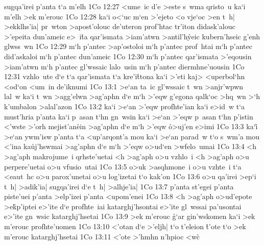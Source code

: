 sugqa'irei
p'anta
t`a
m'elh\bibvsend
\vs 1Co 12:27
<ume~ic
d'e
>este
s~wma
qristo~u
ka`i
m'elh
>ek
m'erouc\bibvsend
\vs 1Co 12:28
ka`i
o<`uc
m`en
>'ejeto
<o
vje`oc
>en
t~h|
>ekklhs'ia|
pr~wton
>apost'olouc
de'uteron
prof'htac
tr'iton
didask'alouc
>'epeita
dun'ameic
e>~i\r{t}a
qar'ismata
>iam'atwn
>antil'h\r{y}eic
kubern'hseic
g'enh
glwss~wn\bibvsend
\vs 1Co 12:29
m`h
p'antec
>ap'ostoloi
m`h
p'antec
prof~htai
m`h
p'antec
did'askaloi
m`h
p'antec
dun'ameic\bibvsend
\vs 1Co 12:30
m`h
p'antec
qar'ismata
>'eqousin
>iam'atwn
m`h
p'antec
gl'wssaic
lalo~usin
m`h
p'antec
diermhne'uousin\bibvsend
\vs 1Co 12:31
vzhlo~ute
d`e
t`a
qar'ismata
t`a
kre'i\r{t}tona
ka`i
>'eti
kaj>
<uperbol`hn
<od`on
<um~in
de'iknumi\bibvsend
\vs 1Co 13:1
>e`an
ta~ic
gl'wssaic
t~wn
>anjr'wpwn
lal~w
ka`i
t~wn
>agg'elwn
>ag'aphn
d`e
m`h
>'eqw
g'egona
qalk`oc
>hq~wn
>`h
k'umbalon
>alal'azon\bibvsend
\vs 1Co 13:2
ka`i
>e`an
>'eqw
profhte'ian
ka`i
e>id~w
t`a
must'hria
p'anta
ka`i
p~asan
t`hn
gn~wsin
ka`i
>e`an
>'eqw
p~asan
t`hn
p'istin
<'wste
>'orh
mejist'an\r{e}in
>ag'aphn
d`e
m`h
>'eqw
\r{o}>uj'en
e>imi\bibvsend
\vs 1Co 13:3
ka`i\r{}
>e`an
ywm'isw
p'anta
t`a
<up'arqont'a
mou
ka`i
>e`an
parad~w
t`o
s~wm'a
mou
<'ina
ka\r{u}j'hswmai
>ag'aphn
d`e
m`h
>'eqw
o>ud`en
>wfelo~umai\bibvsend
\vs 1Co 13:4
<h
>ag'aph
makrojume~i
qrhste'uetai
<h
>ag'aph
o>u
vzhlo~i
<h
>ag'aph
o>u
perpere'uetai
o>u
vfusio~utai\bibvsend
\vs 1Co 13:5
o>uk
>asqhmone~i
o>u
vzhte~i
t`a
<eaut~hc
o>u
parox'unetai
o>u
log'izetai
t`o
kak'on\bibvsend
\vs 1Co 13:6
o>u
qa'irei
>ep`i
t~h|
>adik'ia|
sugqa'irei
d`e
t~h|
>alhje'ia|\bibvsend
\vs 1Co 13:7
p'anta
st'egei
p'anta
piste'uei
p'anta
>elp'izei
p'anta
<upom'enei\bibvsend
\vs 1Co 13:8
<h
>ag'aph
o>ud'epote
>e\r{k}p'iptei
e>'ite
d`e
profhte~iai
katarghj'hsontai
e>'ite
gl~wssai
pa'usontai
e>'ite
gn~wsic
katarghj'hsetai\bibvsend
\vs 1Co 13:9
>ek
m'erouc
\r{g}`ar
gin'wskomen
ka`i
>ek
m'erouc
profhte'uomen\bibvsend
\vs 1Co 13:10
<'otan
d`e
>'eljh|
t`o
t'eleion
\r{t}'ote
t`o
>ek
m'erouc
katarghj'hsetai\bibvsend
\vs 1Co 13:11
<'ote
>'hmhn
n'hpioc
<wc\r{}
